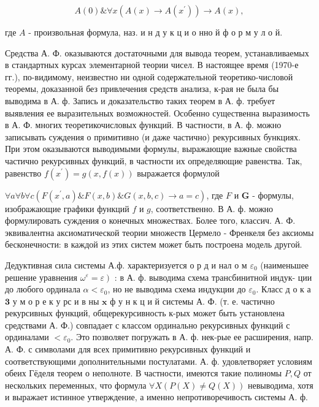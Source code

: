 \documentclass[10pt]{article}
\begin{document}
\[

A(0) \& \forall x\left(A(x) \longrightarrow A\left(x^{\prime}\right)\right) \longrightarrow A(x),

\]



где $A$ - произвольная формула, наз. и н д у к ц и о нно й ф о р м у л о й.



Средства А. Ф. оказываются достаточными для вывода теорем, устанавливаемых в стандартных курсах элементарной теории чисел. В настоящее время (1970-е гг.), по-видимому, неизвестно ни одной содержательной теоретико-числовой теоремы, доказанной без привлечения средств анализа, к-рая не была бы выводима в А. ф. Запись и доказательство таких теорем в А. ф. требует выявления ее выразительных возможностей. Особенно существенна выразимость в А. Ф. многих теоретикочисловых функций. В частности, в А. ф. можно записывать суждения о примитивно (и даже частично) рекурсивных бункциях. При этом оказываются выводимыми формулы, выражающие важные свойства частично рекурсивных функций, в частности их определяющие равенства. Так, равенство $f\left(x^{\prime}\right)=g(x, f(x))$ выражается формулой



$\forall a \forall b \forall c\left(F\left(x^{\prime}, a\right) \& F(x, b) \& G(x, b, c) \longrightarrow a=c\right)$, где $F$ и $\boldsymbol{G}$ - формулы, изображающие графики функций $f$ и $g$, соответственно. В А. ф. можно формулировать суждения о конечных множествах. Более того, классич. А. Ф. эквивалентна аксиоматической теории множеств Цермело - Френкеля без аксиомы бесконечности: в каждой из этих систем может быть построена модель другой.



Дедуктивная сила системы А.ф. характеризуется о р д и нал о м $\varepsilon_{0}$ (наименьшее решение уравнения $\left.\omega^{\varepsilon}=\varepsilon\right)$ : в А. ф. выводима схема трансбинитной индук- ции до любого ординала $\alpha<\varepsilon_{0}$, но не выводима схема индукции до $\varepsilon_{0}$. Класс д о к а $\mathbf{3}$ у м о р е к у рс и в ны $\mathbf{x}$ ф у н к ц и й системы А. Ф. (т. е. частично рекурсивных функций, общерекурсивность к-рых может быть установлена средствами А. Ф.) совпадает с классом ординально рекурсивных функций с ординалами $<\varepsilon_{0}$. Это позволяет погружать в А. ф. нек-рые ее расширения, напр. А. Ф. с символами для всех примитивно рекурсивных функций и соответствующими дополнительными постулатами. А. ф. удовлетворяет условиям обеих Гёделя теорем о неполноте. В частности, имеются такие полиномы $P, Q$ от нескольких переменных, что формула $\forall X(P(X) \neq Q(X))$ невыводима, хотя и выражает истинное утверждение, а именно непротиворечивость системы А. ф.
\end{document}
